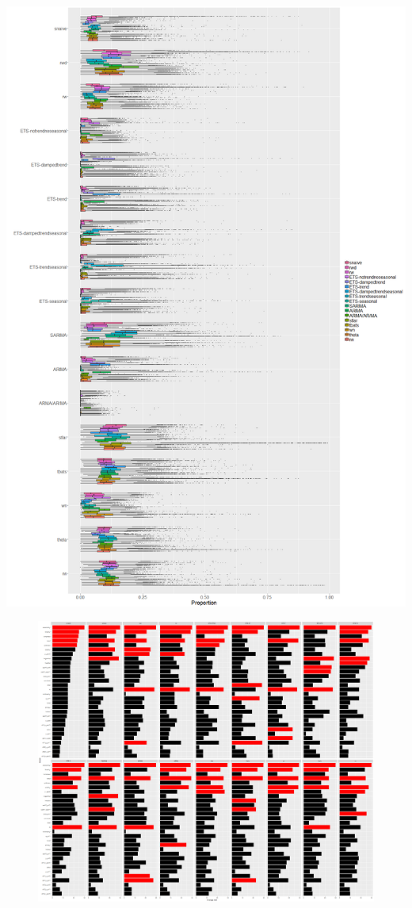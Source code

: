 \documentclass[11pt,a4paper,]{article}
\theoremstyle{definition}
\theoremstyle{definition}
\theoremstyle{definition}
\theoremstyle{remark}
\begin{document}
\includegraphics{figures/oob_monthly-1.png}

\newpage

\begin{figure}[h]

{\centering \includegraphics{figures/vi_monthly-1} 

}

\end{figure}
\end{document}
